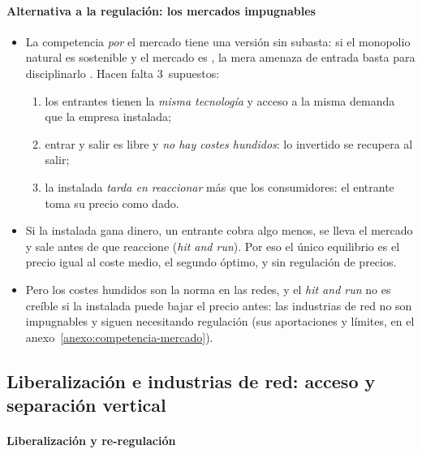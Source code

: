 \documentclass[11pt]{article}
\begin{document}
\paragraph{Alternativa a la regulación: los mercados impugnables}

\begin{itemize}
\item La competencia \emph{por} el mercado tiene una versión sin subasta: si el monopolio natural es sostenible y el mercado es , la mera amenaza de entrada basta para disciplinarlo\nocite{Baumol1982Contestable,BaumolPanzarWillig1982Contestable} . Hacen falta 3~supuestos:
  \begin{enumerate}
  \item los entrantes tienen la \emph{misma tecnología} y acceso a la misma demanda que la empresa instalada;
  \item entrar y salir es libre y \emph{no hay costes hundidos}: lo invertido se recupera al salir;
  \item la instalada \emph{tarda en reaccionar} más que los consumidores: el entrante toma su precio como dado.
  \end{enumerate}
\item Si la instalada gana dinero, un entrante cobra algo menos, se lleva el mercado y sale antes de que reaccione (\emph{hit and run}). Por eso el único equilibrio es el precio igual al coste medio, el segundo óptimo, y sin regulación de precios.
\item Pero los costes hundidos son la norma en las redes, y el \emph{hit and run} no es creíble si la instalada puede bajar el precio antes: las industrias de red no son impugnables y siguen necesitando regulación (sus aportaciones y límites, en el anexo~\ref{anexo:competencia-mercado}).
\end{itemize}
\subsection{Liberalización e industrias de red:\cortetitulo{} acceso y separación vertical}\label{sec:acceso-red}

\paragraph{Liberalización y re-regulación}
\end{document}
